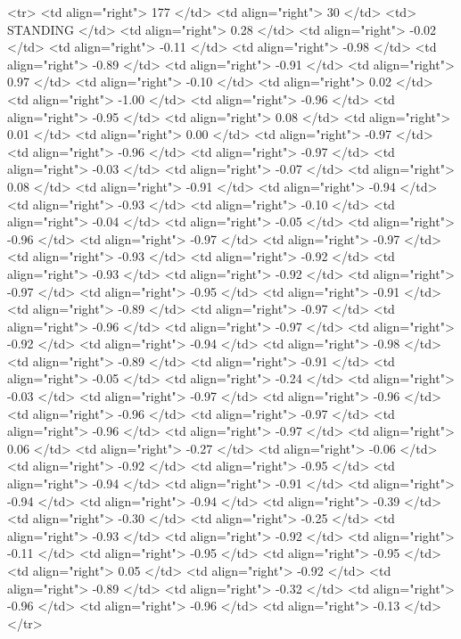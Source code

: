   <tr> <td align="right"> 177 </td> <td align="right">  30 </td> <td> STANDING </td> <td align="right"> 0.28 </td> <td align="right"> -0.02 </td> <td align="right"> -0.11 </td> <td align="right"> -0.98 </td> <td align="right"> -0.89 </td> <td align="right"> -0.91 </td> <td align="right"> 0.97 </td> <td align="right"> -0.10 </td> <td align="right"> 0.02 </td> <td align="right"> -1.00 </td> <td align="right"> -0.96 </td> <td align="right"> -0.95 </td> <td align="right"> 0.08 </td> <td align="right"> 0.01 </td> <td align="right"> 0.00 </td> <td align="right"> -0.97 </td> <td align="right"> -0.96 </td> <td align="right"> -0.97 </td> <td align="right"> -0.03 </td> <td align="right"> -0.07 </td> <td align="right"> 0.08 </td> <td align="right"> -0.91 </td> <td align="right"> -0.94 </td> <td align="right"> -0.93 </td> <td align="right"> -0.10 </td> <td align="right"> -0.04 </td> <td align="right"> -0.05 </td> <td align="right"> -0.96 </td> <td align="right"> -0.97 </td> <td align="right"> -0.97 </td> <td align="right"> -0.93 </td> <td align="right"> -0.92 </td> <td align="right"> -0.93 </td> <td align="right"> -0.92 </td> <td align="right"> -0.97 </td> <td align="right"> -0.95 </td> <td align="right"> -0.91 </td> <td align="right"> -0.89 </td> <td align="right"> -0.97 </td> <td align="right"> -0.96 </td> <td align="right"> -0.97 </td> <td align="right"> -0.92 </td> <td align="right"> -0.94 </td> <td align="right"> -0.98 </td> <td align="right"> -0.89 </td> <td align="right"> -0.91 </td> <td align="right"> -0.05 </td> <td align="right"> -0.24 </td> <td align="right"> -0.03 </td> <td align="right"> -0.97 </td> <td align="right"> -0.96 </td> <td align="right"> -0.96 </td> <td align="right"> -0.97 </td> <td align="right"> -0.96 </td> <td align="right"> -0.97 </td> <td align="right"> 0.06 </td> <td align="right"> -0.27 </td> <td align="right"> -0.06 </td> <td align="right"> -0.92 </td> <td align="right"> -0.95 </td> <td align="right"> -0.94 </td> <td align="right"> -0.91 </td> <td align="right"> -0.94 </td> <td align="right"> -0.94 </td> <td align="right"> -0.39 </td> <td align="right"> -0.30 </td> <td align="right"> -0.25 </td> <td align="right"> -0.93 </td> <td align="right"> -0.92 </td> <td align="right"> -0.11 </td> <td align="right"> -0.95 </td> <td align="right"> -0.95 </td> <td align="right"> 0.05 </td> <td align="right"> -0.92 </td> <td align="right"> -0.89 </td> <td align="right"> -0.32 </td> <td align="right"> -0.96 </td> <td align="right"> -0.96 </td> <td align="right"> -0.13 </td> </tr>

